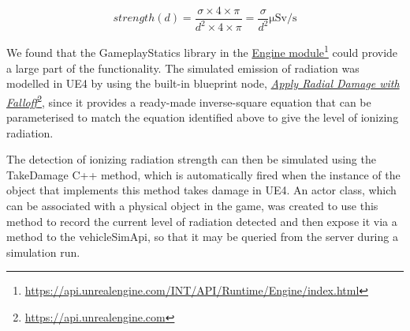 \[strength(d) = \frac{\sigma \times 4 \times \pi}{d^2 \times 4 \times \pi} = \frac{\sigma}{d^2} \si{\micro\sievert\per\second}\]

We found that the GameplayStatics library in the \href{https://api.unrealengine.com/INT/API/Runtime/Engine/index.html}{Engine module}\footnote{\href{https://api.unrealengine.com/INT/API/Runtime/Engine/index.html}{https://api.unrealengine.com/INT/API/Runtime/Engine/index.html}}  %
could provide a large part of the functionality. The simulated emission of radiation was modelled in UE4 by using the built-in blueprint node,
\href{https://api.unrealengine.com/INT/API/Runtime/Engine/Kismet/UGameplayStatics/ApplyRadialDamageWithFalloff/index.html}{\emph{Apply Radial Damage with Falloff}}\footnote{\href{https://api.unrealengine.com/INT/API/Runtime/Engine/Kismet/UGameplayStatics/ApplyRadialDamageWithFalloff/index.html}{https://api.unrealengine.com}}, since it provides a ready-made inverse-square equation that can be parameterised to match the equation identified above to give the level of ionizing radiation.


The detection of ionizing radiation strength can then be simulated using the TakeDamage C++ method, which is automatically fired when the instance of the object that implements this method takes damage in UE4. An actor class, which can be associated with a physical object in the game, was created to use this method to record the current level of radiation detected and then expose it via a method to the vehicleSimApi, so that it may be queried from the server during a simulation run.

